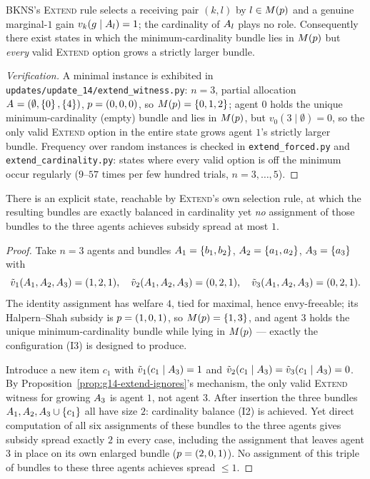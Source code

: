 \begin{proposition}
\label{prop:g14-extend-ignores}
BKNS's \textsc{Extend} rule selects a receiving pair $(k,l)$ by
$l\in M(p)$ and a genuine marginal-$1$ gain
$v_k(g\mid A_{l})=1$; the cardinality of $A_{l}$ plays no role.
Consequently there exist states in which the minimum-cardinality bundle lies
in $M(p)$ but \emph{every} valid \textsc{Extend} option grows a
strictly larger bundle.
\end{proposition}
\begin{proof}[Verification]
A minimal instance is exhibited in \texttt{updates/update\_14/extend\_witness.py}:
$n=3$, partial allocation $A_{} = (\emptyset,\left\{0\right\},\left\{4\right\})$,
$p=(0,0,0)$, so $M(p)=\left\{0,1,2\right\}$; agent $0$ holds the unique
minimum-cardinality (empty) bundle and lies in $M(p)$, but
$v_0(3\mid\emptyset)=0$, so the only valid \textsc{Extend} option in the
entire state grows agent $1$'s strictly larger bundle. Frequency over random
instances is checked in \texttt{extend\_forced.py} and
\texttt{extend\_cardinality.py}: states where every valid option is off the
minimum occur regularly ($9$--$57$ times per few hundred trials,
$n=3,\dots,5$).
\end{proof}

\begin{theorem}
\label{thm:g14-closure}
There is an explicit state, reachable by \textsc{Extend}'s own selection
rule, at which the resulting bundles are exactly balanced in cardinality yet
\emph{no} assignment of those bundles to the three agents achieves subsidy
spread at most $1$.
\end{theorem}
\begin{proof}
Take $n=3$ agents and bundles $A_{1}=\left\{b_1,b_2\right\}$,
$A_{2}=\left\{a_1,a_2\right\}$, $A_{3}=\left\{a_3\right\}$ with
\[
  \tilde v_1(A_{1},A_{2},A_{3}) = (1,2,1), \quad
  \tilde v_2(A_{1},A_{2},A_{3}) = (0,2,1), \quad
  \tilde v_3(A_{1},A_{2},A_{3}) = (0,2,1).
\]
The identity assignment has welfare $4$, tied for maximal, hence
envy-freeable; its Halpern--Shah subsidy is $p=(1,0,1)$, so
$M(p)=\left\{1,3\right\}$, and agent $3$ holds the unique minimum-cardinality
bundle while lying in $M(p)$ --- exactly the configuration (I3) is
designed to produce.

Introduce a new item $c_1$ with $\tilde v_1(c_1\mid A_{3})=1$ and
$\tilde v_2(c_1\mid A_{3})=\tilde v_3(c_1\mid A_{3})=0$. By
Proposition~\ref{prop:g14-extend-ignores}'s mechanism, the only valid
\textsc{Extend} witness for growing $A_{3}$ is agent $1$, not agent $3$.
After insertion the three bundles $A_{1},A_{2},A_{3}\cup\left\{c_1\right\}$
all have size $2$: cardinality balance (I2) is achieved. Yet direct
computation of all six assignments of these bundles to the three agents
gives subsidy spread exactly $2$ in every case, including the assignment
that leaves agent $3$ in place on its own enlarged bundle
($p=(2,0,1)$). No assignment of this triple of bundles to these three
agents achieves spread $\le 1$.
\end{proof}

